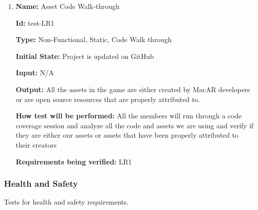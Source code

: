 \documentclass[12pt, titlepage]{article}
\begin{document}
\begin{enumerate}

\item{\textbf{Name:} Asset Code Walk-through}

\textbf{Id:} test-LR1

\textbf{Type:} Non-Functional, Static, Code Walk through
					
\textbf{Initial State:} Project is updated on GitHub
					
\textbf{Input:} N/A
					
\textbf{Output:} All the assets in the game are either created by MacAR developers or are open source resources that are properly attributed to. 
					
\textbf{How test will be performed:} All the members will run through a code coverage session and analyze all the code and assets we are using and verify if they are either our assets or assets that have been properly attributed to their creators

\textbf{Requirements being verified:} LR1
					
\end{enumerate}

\subsubsection{Health and Safety}
Tests for health and safety requirements. 
\end{document}
